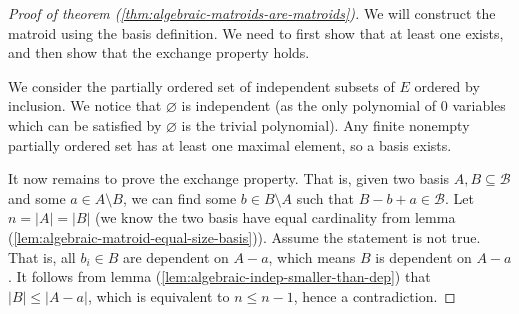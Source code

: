 \begin{proof}[Proof of theorem (\ref{thm:algebraic-matroids-are-matroids})]
	We will construct the matroid using the basis definition. We need to first show that at least one exists, and then show that the exchange property holds.

	We consider the partially ordered set of independent subsets of $E$ ordered by inclusion. We notice that $ \varnothing $ is independent (as the only polynomial of $0$ variables which can be satisfied by $\varnothing $ is the trivial polynomial). Any finite nonempty partially ordered set has at least one maximal element, so a basis exists.

	It now remains to prove the exchange property. That is, given two basis $A, B \subseteq \mathcal B$ and some $a \in A \setminus B$, we can find some $b \in B \setminus A$ such that $B - b + a \in \mathcal B$. Let $n = |A| = |B|$ (we know the two basis have equal cardinality from lemma (\ref{lem:algebraic-matroid-equal-size-basis})). Assume the statement is not true. That is, all $b _i \in B$ are dependent on $A - a$, which means $B$ is dependent on $A - a$. It follows from lemma (\ref{lem:algebraic-indep-smaller-than-dep}) that $|B| \leq |A - a|$, which is equivalent to $n \leq n - 1$, hence a contradiction.
\end{proof}


